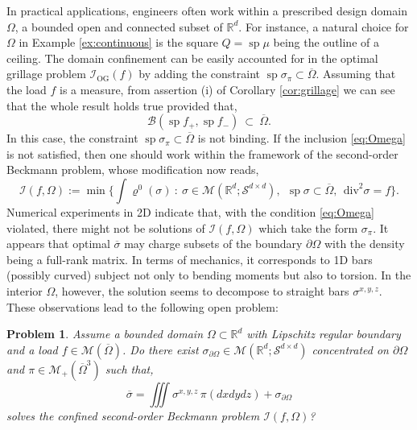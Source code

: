 \documentclass[11pt,letterpaper,reqno]{amsart}
\newtheorem{prob}[theorem]{Problem}
\theoremstyle{definition}
\numberwithin{equation}{section}
\newcommand{\R}{\mathbb{R}}
\newcommand{\Rd}{\R^d}
\newcommand{\ov}{\overline}
\newcommand{\B}{\mathcal{B}}
\newcommand{\Ob}{{\overline{\Omega}}}
\newcommand{\bO}{{\partial\Omega}}
\newcommand{\Mes}{{\mathcal{M}}}
\newcommand{\dive}{{\mathrm{div}}}
\newcommand{\I}{\mathcal{I}}
\newcommand{\Sdd}{{\mathcal{S}^{d \times d}}}
\DeclareMathOperator{\spt}{sp}
\begin{document}
{In practical applications, engineers often work within a prescribed  design domain $\Omega$, a bounded open and connected subset of $\Rd$. For instance, a natural choice for $\Omega$ in Example \eqref{ex:continuous} is the square $Q = \spt \mu$ being the outline of a ceiling. 
The domain confinement can be easily accounted for in the optimal grillage problem $\I_{\mathrm{OG}}(f)$ by adding the constraint $\spt \sigma_\pi \subset \Ob$. Assuming that the load $f$ is a measure, from assertion (i) of Corollary \ref{cor:grillage} we can see that the whole result holds true provided that,
\begin{equation}
	\label{eq:Omega}
	\B(\spt f_+, \spt f_-) \ \subset \ \ov{\Omega}.
\end{equation}
In this case, the constraint $\spt \sigma_\pi \subset \Ob$ is not binding. If the inclusion \eqref{eq:Omega} is not satisfied, then one should work within the framework of the second-order Beckmann problem, whose modification now reads,
\begin{equation*}
	\mathcal{I}(f,\Omega)  := \min \biggl\{ \int \varrho^0(\sigma) \ : \ \sigma \in \Mes(\R^d;\Sdd),  \ \ \spt \sigma \subset \Ob,  \ \ \dive^2 \sigma = f  \biggr\}.
\end{equation*}
Numerical experiments in 2D indicate that, with the condition \eqref{eq:Omega} violated, there might not be solutions of $\I(f,\Omega)$ which take the form $\sigma_\pi$. It appears that optimal $\ov{\sigma}$ may charge subsets of the boundary $\partial \Omega$ with the density being a full-rank matrix. In terms of mechanics, it corresponds to 1D bars (possibly curved) subject not only to bending moments but also to torsion. In the interior $\Omega$, however, the solution seems to decompose to straight bars $\sigma^{x,y,z}$. These observations lead to the following open problem:
\begin{prob}
	Assume a bounded domain $\Omega \subset \Rd$ with Lipschitz regular boundary and a load $f \in  \Mes(\Ob)$. Do there exist  $\sigma_\bO \in \Mes(\R^d;\Sdd)$ concentrated on $\bO$ and $\pi \in \Mes_+(\ov\Omega ^3)$  such that,
	\begin{equation*}
		\ov{\sigma} =  \iiint \sigma^{x,y,z} \, \pi(dxdydz) + \sigma_\bO
	\end{equation*}
	solves the confined  second-order Beckmann  problem $\mathcal{I}(f,\Omega)$?
\end{prob}



\smallskip





}
\end{document}
